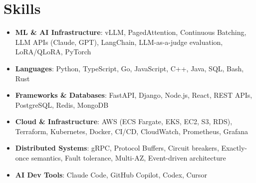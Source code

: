 \documentclass[letterpaper,11pt]{article}
\newcommand{\resumeSubHeadingListStart}{\begin{itemize}[leftmargin=0.15in, label={}]}
\newcommand{\resumeSubHeadingListEnd}{\end{itemize}}
\newcommand{\resumeSkillHeading}[2]{%
  \item\small{\textbf{#1}: #2 \vspace{-9pt}}%
}
\begin{document}
\section{Skills}
  \resumeSubHeadingListStart
    \resumeSkillHeading{ML \& AI Infrastructure}{vLLM, PagedAttention, Continuous Batching, LLM APIs (Claude, GPT), LangChain, LLM-as-a-judge evaluation, LoRA/QLoRA, PyTorch}
    \resumeSkillHeading{Languages}{Python, TypeScript, Go, JavaScript, C++, Java, SQL, Bash, Rust}
    \resumeSkillHeading{Frameworks \& Databases}{FastAPI, Django, Node.js, React, REST APIs, PostgreSQL, Redis, MongoDB}
    \resumeSkillHeading{Cloud \& Infrastructure}{AWS (ECS Fargate, EKS, EC2, S3, RDS), Terraform, Kubernetes, Docker, CI/CD, CloudWatch, Prometheus, Grafana}
    \resumeSkillHeading{Distributed Systems}{gRPC, Protocol Buffers, Circuit breakers, Exactly-once semantics, Fault tolerance, Multi-AZ, Event-driven architecture}
    \resumeSkillHeading{AI Dev Tools}{Claude Code, GitHub Copilot, Codex, Cursor}
  \resumeSubHeadingListEnd
\end{document}
